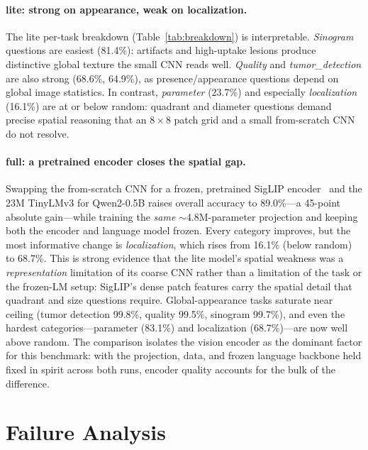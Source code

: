 \documentclass[11pt]{article}
\begin{document}
\paragraph{lite: strong on appearance, weak on localization.}
The lite per-task breakdown (Table~\ref{tab:breakdown}) is interpretable.
\emph{Sinogram} questions are easiest (81.4\%): artifacts and high-uptake lesions
produce distinctive global texture the small CNN reads well. \emph{Quality} and
\emph{tumor\_detection} are also strong (68.6\%, 64.9\%), as presence/appearance
questions depend on global image statistics. In contrast, \emph{parameter}
(23.7\%) and especially \emph{localization} (16.1\%) are at or below random:
quadrant and diameter questions demand precise spatial reasoning that an
$8\times8$ patch grid and a small from-scratch CNN do not resolve.

\paragraph{full: a pretrained encoder closes the spatial gap.}
Swapping the from-scratch CNN for a frozen, pretrained SigLIP
encoder~\cite{zhai2023siglip} and the 23M TinyLMv3 for Qwen2-0.5B raises overall
accuracy to 89.0\%---a 45-point absolute gain---while training the \emph{same}
$\sim$4.8M-parameter projection and keeping both the encoder and language model
frozen. Every category improves, but the most informative change is
\emph{localization}, which rises from 16.1\% (below random) to 68.7\%. This is
strong evidence that the lite model's spatial weakness was a
\emph{representation} limitation of its coarse CNN rather than a limitation of the
task or the frozen-LM setup: SigLIP's dense patch features carry the spatial
detail that quadrant and size questions require. Global-appearance tasks
saturate near ceiling (tumor detection 99.8\%, quality 99.5\%, sinogram 99.7\%),
and even the hardest categories---parameter (83.1\%) and localization
(68.7\%)---are now well above random. The comparison isolates the vision encoder
as the dominant factor for this benchmark: with the projection, data, and frozen
language backbone held fixed in spirit across both runs, encoder quality accounts
for the bulk of the difference.

\section{Failure Analysis}
\label{sec:failure}
\end{document}
